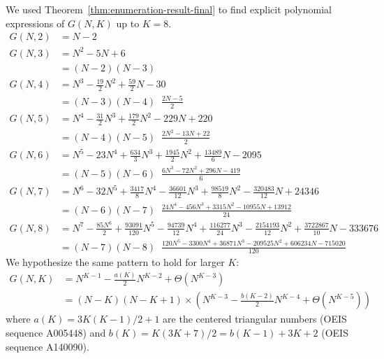 \documentclass{article}
\begin{document}
We used Theorem~\ref{thm:enumeration-result-final} to find explicit polynomial expressions of $G(N,K)$ up to $K=8$. 
\begin{align*}
    G(N,2) &= N-2 \\
    G(N,3) &= N^2 - 5N +6\\
    & = (N-2)(N-3) \\ 
    G(N, 4) &= N^3-\frac{19}{2}N^2+\frac{59}{2}N-30  \\
    & = (N-3)(N-4) \;\; \frac{2N-5}{2} \\
    G(N, 5) &= N^4 -\frac{31}{2} N^3+\frac{179}{2}N^2-229N+220 \\
    & = ( N-4)(N-5) \;\; \frac{2N^2-13N+22}{2} \\ 
    G(N, 6) &= N^5 - 23N^4 + \frac{634}{3}N^3 + \frac{1945}{2}N^2 + \frac{13489}{6}N - 2095 \\
    & = (N-5)(N-6) \;\; \frac{6 N^3 - 72 N^2 + 296 N - 419 }{6}  \\ 
    G(N,7) &= N^6 - 32 N^5 + \frac{3417}{8}N^4 -  \frac{36601}{12} N^3 + \frac{98519}{8} N^2 - \frac{320483}{12}N + 24346\\
    &= (N-6)(N-7)\;\; \frac{24 N^4 - 456 N^3 + 3315 N^2 - 10955 N + 13912 }{24} \\
    G(N,8) &= N^7 -\frac{85N^6}{2} + \frac{93091}{120} N^5 - \frac{94739}{12} N^4 + \frac{116277}{24} N^3 - \frac{2154193}{12} N^2 + \frac{3722867}{10} N - 333676 \\
    &=  (N-7)(N-8) \;\; \frac{120 N^5 - 3300 N^4 + 36871 N^3 - 209525 N^2 + 606234 N - 715020}{120} 
\end{align*}
We hypothesize the same pattern to hold for larger $K$: 
\begin{align*}
    G(N,K) &= N^{K-1} - \frac{a(K)}{2} N^{K-2} + \Theta(N^{K-3}) \\
    &=  (N-K)(N-K+1) \times \left (N^{K-3} - \frac{b(K-2)}{2} N^{K-4} + \Theta(N^{K-5}) \right ) 
\end{align*}
where $a(K)=  3K(K-1)/2 + 1$ are the centered triangular numbers (OEIS sequence A005448) and $b(K) = K(3K+7)/2 = b(K-1)+3K+2$ (OEIS sequence A140090).  
\end{document}
